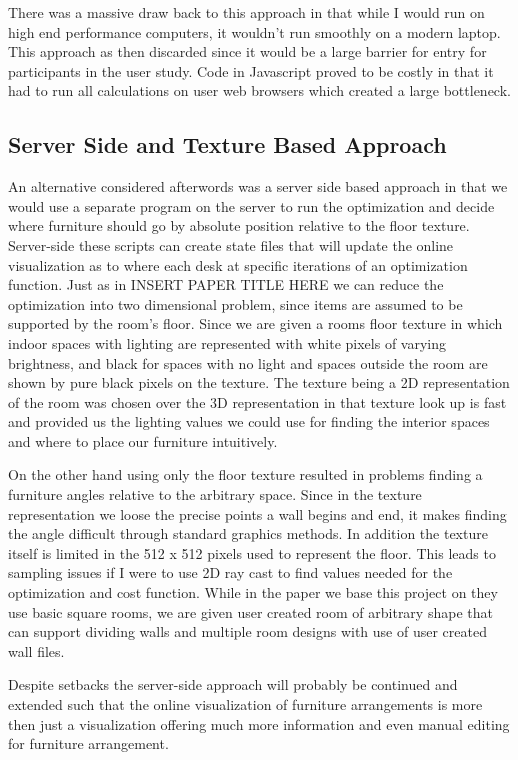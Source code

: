 \documentclass[twoside]{article}
\begin{document}
\begin{multicols}{2}
There was a massive draw back to this approach in that while I would run on high end performance computers, it wouldn't run smoothly on a modern laptop. This approach as then discarded
since it would be a large barrier for entry for participants in the user study. Code in Javascript proved to be costly in that it had to
run all calculations on user web browsers which created a large bottleneck.

\subsection{Server Side and Texture Based Approach}
An alternative considered afterwords was a server side based approach in that we would use a separate program on the server to run the
optimization and decide where furniture should go by absolute position relative to the floor texture. Server-side these scripts can create
state files that will update the online visualization as to where each desk at specific iterations of an optimization function.
Just as in INSERT PAPER TITLE HERE we can reduce the optimization into two dimensional problem, since items are assumed to be supported
by the room's floor. Since we are given a rooms floor texture in which indoor spaces with lighting are represented with white pixels of
varying brightness, and black for spaces with no light and spaces outside the room are shown by pure black pixels on the texture.
The texture being a 2D representation of the room was chosen over the 3D representation in that texture look up is fast and provided us
the lighting values we could use for finding the interior spaces and where to place our furniture intuitively. 

On the other hand using only the floor texture resulted in problems finding a furniture angles relative to the arbitrary space. Since in the texture representation
we loose the precise points a wall begins and end, it makes finding the angle difficult through standard graphics methods. In addition the
texture itself is limited in the 512 x 512 pixels used to represent the floor. This leads to sampling issues if I were to use 2D ray cast
to find values needed for the optimization and cost function.
While in the paper we base this project on they use basic square rooms, we are given user created room of arbitrary shape that can support
dividing walls and multiple room designs with use of user created wall files. 

Despite setbacks the server-side approach will probably be continued and extended such that the online visualization of furniture arrangements
is more then just a visualization offering much more information and even manual editing for furniture arrangement. 


\end{multicols}
\end{document}
